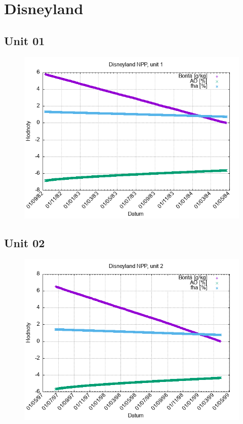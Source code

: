 \documentclass{article}
\begin{document}
\section*{Disneyland}
\subsection*{Unit 01}
\begin{figure}[h!]
\centering
\includegraphics[width=14cm]{./grafy/Disneyland01.png}
\end{figure}
\clearpage
\subsection*{Unit 02}
\begin{figure}[h!]
\centering
\includegraphics[width=14cm]{./grafy/Disneyland02.png}
\end{figure}
\clearpage
\end{document}
